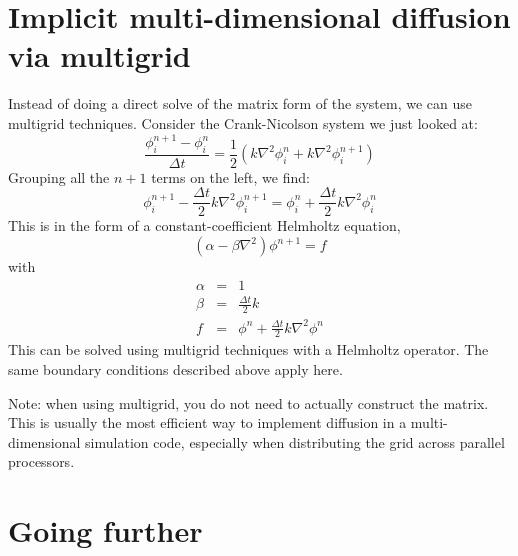 \section{Implicit multi-dimensional diffusion via multigrid}

Instead of doing a direct solve of the matrix form of the system, we 
can use multigrid techniques.  Consider the Crank-Nicolson system we just 
looked at:
\begin{equation}
\frac{\phi^{n+1}_i - \phi^n_i}{\Delta t} = 
   \frac{1}{2} \left ( k \nabla^2 \phi^n_i + k \nabla^2 \phi^{n+1}_i \right )
\end{equation}
Grouping all the 
$n+1$ terms on the left, we find:
\begin{equation}
\phi^{n+1}_i - \frac{\Delta t}{2} k \nabla^2 \phi^{n+1}_i = 
    \phi^n_i + \frac{\Delta t}{2} k \nabla^2 \phi^n_i
\end{equation}
This is in the form of a constant-coefficient Helmholtz equation,
\begin{equation}
(\alpha - \beta \nabla^2) \phi^{n+1} = f
\end{equation}
with
\begin{eqnarray}
\alpha &=& 1 \\
\beta &=& \frac{\Delta t}{2} k \\
f &=& \phi^n + \frac{\Delta t}{2} k \nabla^2 \phi^n
\end{eqnarray}
This can be solved using multigrid techniques with a Helmholtz
operator.  The same boundary conditions described above apply here.

Note: when using multigrid, you do not need to actually construct
the matrix.  This is usually the most efficient way to implement 
diffusion in a multi-dimensional simulation code, especially when
distributing the grid across parallel processors.

\section{Going further}

